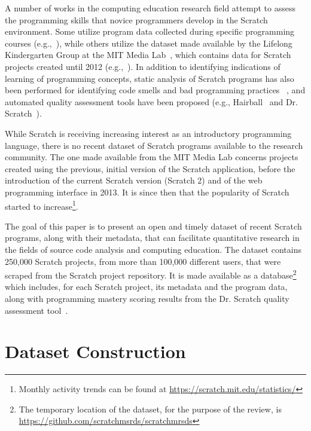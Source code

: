 \documentclass[10pt, conference]{IEEEtran}
\begin{document}
A number of works in the computing education research field attempt to assess the programming skills that novice programmers develop in the Scratch environment.
Some utilize program data collected during specific programming courses (e.g.,~\cite{meerbaum-salant_learning_2010, wilson_evaluation_2012, Maloney_2008}), while others utilize the dataset made available by the Lifelong Kindergarten Group at the MIT Media Lab~\cite{2017_scratch_dataset}, which contains data for Scratch projects created until 2012 (e.g.,~\cite{fields_2014, yang_2015, Dasgupta_2016}).
In addition to identifying indications of learning of programming concepts, static analysis of Scratch programs has also been performed for identifying code smells and bad programming practices ~\cite{Meerbaum_habits_2011, Aivaloglou_2016}, and automated quality assessment tools have been proposed (e.g., Hairball~\cite{boe_hairball:_2013} and Dr. Scratch~\cite{moreno_automatic_2014}).

While Scratch is receiving increasing interest as an introductory programming language, there is no recent dataset of Scratch programs available to the research community.
The one made available from the MIT Media Lab concerns projects created using the previous, initial version of the Scratch application, before the introduction of the current Scratch version (Scratch 2) and of the web programming interface in 2013.
It is since then that the popularity of Scratch started to increase\footnote{Monthly activity trends can be found at \url{https://scratch.mit.edu/statistics/}}.

The goal of this paper is to present an open and timely dataset of recent Scratch programs, along with their metadata, that can facilitate quantitative research in the fields of source code analysis and computing education.
The dataset contains 250,000 Scratch projects, from more than 100,000 different users, that were scraped from the Scratch project repository.
It is made available as a database\footnote{\label{dataseturl}The temporary location of the dataset, for the purpose of the review, is \url{https://github.com/scratchmsrds/scratchmrsds}} which includes, for each Scratch project, its metadata and the program data, along with programming mastery scoring results from the Dr. Scratch quality assessment tool~\cite{moreno_automatic_2014}.

\section{Dataset Construction}
\label{dataset}
\end{document}
